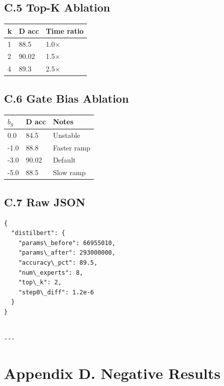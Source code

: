 \subsection{C.5 Top-K Ablation}

\begin{table}[H]
\centering
\small
\begin{tabular}{lll}
\toprule
\textbf{k} & \textbf{D acc} & \textbf{Time ratio} \\
\midrule
1 & 88.5 & 1.0$\times$ \\
2 & 90.02 & 1.5$\times$ \\
4 & 89.3 & 2.5$\times$ \\
\bottomrule
\end{tabular}
\end{table}

\subsection{C.6 Gate Bias Ablation}

\begin{table}[H]
\centering
\small
\begin{tabular}{lll}
\toprule
\textbf{$b_g$} & \textbf{D acc} & \textbf{Notes} \\
\midrule
0.0 & 84.5 & Unstable \\
-1.0 & 88.8 & Faster ramp \\
-3.0 & 90.02 & Default \\
-5.0 & 88.5 & Slow ramp \\
\bottomrule
\end{tabular}
\end{table}

\subsection{C.7 Raw JSON}

\begin{lstlisting}
{
  "distilbert": {
    "params\_before": 66955010,
    "params\_after": 293000000,
    "accuracy\_pct": 89.5,
    "num\_experts": 8,
    "top\_k": 2,
    "step0\_diff": 1.2e-6
  }
}
\end{lstlisting}
\begin{lstlisting}

---
\end{lstlisting}

\section{Appendix D. Negative Results}

